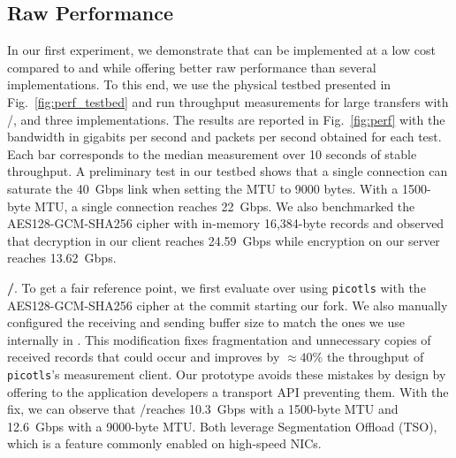 


\subsection{Raw Performance} \label{sec:perf}
In our first experiment, we demonstrate that \tcpls can be implemented at a low
cost compared to \tcp and \tls while offering better raw performance than
several \quic implementations. To this end, we use the physical testbed
presented in Fig.~\ref{fig:perf_testbed} and run throughput measurements for
large transfers with \tcp/\tls, \tcpls and three \quic implementations.
The results are reported in Fig.~\ref{fig:perf} with the bandwidth
in gigabits per second and packets per second obtained for each test.
Each bar corresponds to the median measurement over 10 seconds of stable
throughput. A preliminary test in our testbed shows that a single \tcp connection can saturate the 40~Gbps link when setting the MTU to 9000 bytes. With a 1500-byte MTU, a single \tcp connection reaches 22~Gbps. We also benchmarked the AES128-GCM-SHA256 cipher with in-memory 16,384-byte \tls records and observed that decryption in our client reaches 24.59~Gbps while encryption on our server reaches 13.62~Gbps.


\textbf{\tcp/\tls}. To get a fair reference point, we first evaluate \tls over
\tcp using \texttt{picotls} with the AES128-GCM-SHA256 cipher at the commit
starting our fork. We also manually configured the receiving and sending buffer size to match the ones we use internally in \tcpls. This modification fixes fragmentation and unnecessary copies of received \tls records that could occur and improves by $\approx 40\%$ the throughput of \texttt{picotls}'s measurement client. Our \tcpls prototype avoids these mistakes by design by offering to the application developers a transport API preventing them. %
With the fix, we can observe that \tcp/\tls reaches 10.3~Gbps with a 1500-byte MTU and 12.6~Gbps with a 9000-byte MTU. Both leverage \tcp Segmentation Offload (TSO), which is a feature commonly enabled on high-speed NICs.

